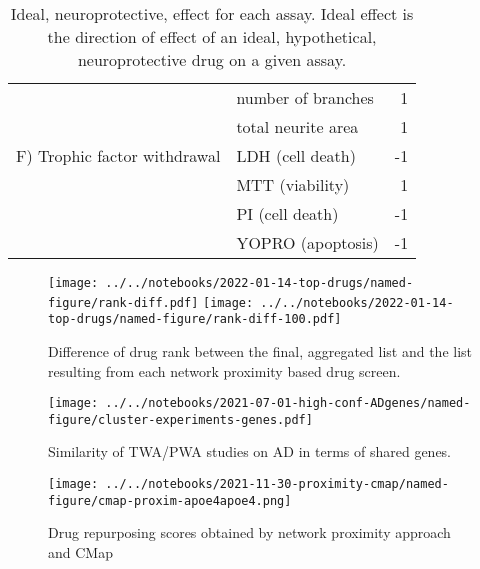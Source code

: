 \documentclass[letterpaper]{article}
\begin{document}
\begin{table}[p]
\begin{tabular}{llr}
                              & number of branches &                                                  1 \\
                              & total neurite area &                                                  1 \\
F)  Trophic factor withdrawal & LDH (cell death) &                                                 -1 \\
                              & MTT (viability) &                                                  1 \\
                              & PI (cell death) &                                                 -1 \\
                              & YOPRO (apoptosis) &                                                 -1 \\
\bottomrule
\end{tabular}
\caption{
  Ideal, neuroprotective, effect for each assay.  Ideal effect is the
  direction of effect of an ideal, hypothetical, neuroprotective drug on a
  given assay.
}
\label{tab:protect-sign}
\end{table}

\begin{figure}[p]
\texttt{[image: ../../notebooks/2022-01-14-top-drugs/named-figure/rank-diff.pdf]}
\texttt{[image: ../../notebooks/2022-01-14-top-drugs/named-figure/rank-diff-100.pdf]}
\caption{
Difference of drug rank between the final, aggregated list and the list
resulting from each network proximity based drug screen.
}
\label{fig:rank-diff}
\end{figure}


\begin{figure}
\texttt{[image: ../../notebooks/2021-07-01-high-conf-ADgenes/named-figure/cluster-experiments-genes.pdf]}
\caption{
Similarity of TWA/PWA studies on AD in terms of shared genes.
}
\label{fig:twas-clustermap}
\end{figure}

\begin{figure}[p]
\texttt{[image: ../../notebooks/2021-11-30-proximity-cmap/named-figure/cmap-proxim-apoe4apoe4.png]}
\caption{
Drug repurposing scores obtained by network proximity approach and CMap
}
\label{fig:proxim-cmap}
\end{figure}
\end{document}

